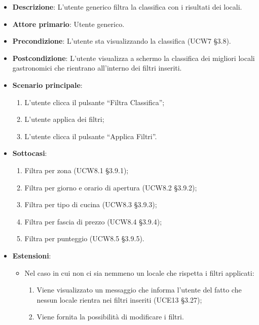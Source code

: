 \begin{itemize}
	\item \textbf{Descrizione}: L'utente generico filtra la classifica con i risultati dei locali.
    \item \textbf{Attore primario}: Utente generico.
    \item \textbf{Precondizione}: L’utente sta visualizzando la classifica (UCW7 §3.8).
    \item \textbf{Postcondizione}: L’utente visualizza a schermo la classifica dei migliori locali gastronomici che rientrano all’interno dei filtri inseriti.
    \item \textbf{Scenario principale}: 
    \begin{enumerate}
        \item L’utente clicca il pulsante “Filtra Classifica”;
        \item L’utente applica dei filtri;
        \item L’utente clicca il pulsante “Applica Filtri”.
    \end{enumerate}

    \item \textbf{Sottocasi}:
    \begin{enumerate}
        \item Filtra per zona (UCW8.1 §3.9.1);
        \item Filtra per giorno e orario di apertura (UCW8.2 §3.9.2);
        \item Filtra per tipo di cucina (UCW8.3 §3.9.3);
        \item Filtra per fascia di prezzo (UCW8.4 §3.9.4);
        \item Filtra per punteggio (UCW8.5 §3.9.5).
    \end{enumerate}

    \item \textbf{Estensioni}:
    \begin{itemize}
        \item Nel caso in cui non ci sia nemmeno un locale che rispetta i filtri applicati:
        \begin{enumerate}
            \item Viene visualizzato un messaggio che informa l’utente del fatto che nessun locale rientra nei filtri inseriti (UCE13 §3.27);
            \item Viene fornita la possibilità di modificare i filtri.
        \end{enumerate}
    \end{itemize}
\end{itemize}

